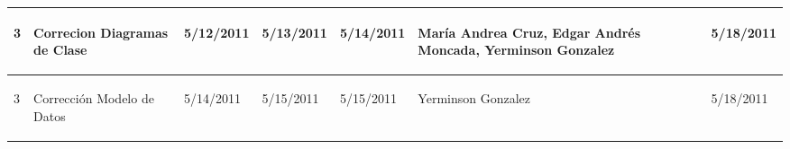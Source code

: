 \begin{center}
\begin{longtable}{|p{}|p{}|p{}|p{}|p{}|p{}|p{}|p{}|}
{\begin{center} 3 \end{center}} & 
{\begin{center} Correcion Diagramas de Clase \end{center}} & 
{\begin{center} 5/12/2011 \end{center}} & 
{\begin{center} 5/13/2011 \end{center}} & 
{\begin{center} 5/14/2011 \end{center}} & 
{\begin{center} María Andrea Cruz, Edgar Andrés Moncada, Yerminson Gonzalez \end{center}} & 
{\begin{center}  \end{center}} & 
{\begin{center} 5/18/2011 \end{center}}\\
\hline

{\begin{center} 3 \end{center}} & 
{\begin{center} Corrección Modelo de Datos \end{center}} & 
{\begin{center} 5/14/2011 \end{center}} & 
{\begin{center} 5/15/2011 \end{center}} & 
{\begin{center} 5/15/2011 \end{center}} & 
{\begin{center} Yerminson Gonzalez \end{center}} & 
{\begin{center}  \end{center}} & 
{\begin{center} 5/18/2011 \end{center}}\\
\hline


\end{longtable}
\end{center}
